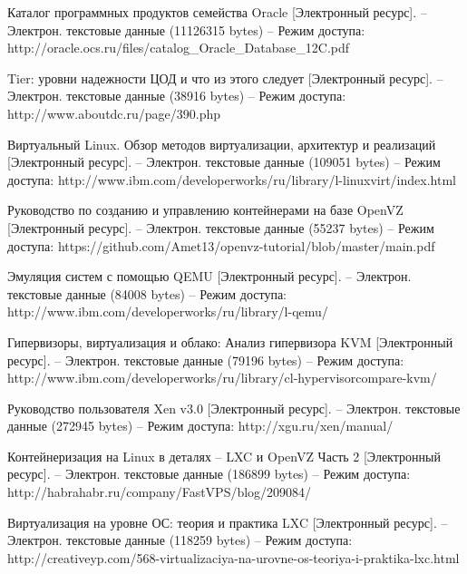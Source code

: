 \begingroup 
\renewcommand{\section}[2]{\anonsection{Библиографический список}}
\begin{thebibliography}{00}

    Каталог программных продуктов семейства Oracle
    [Электронный ресурс]. --
    Электрон. текстовые данные (11126315 bytes) --
    Режим доступа: http://oracle.ocs.ru/files/catalog\_Oracle\_Database\_12C.pdf

    Tier: уровни надежности ЦОД и что из этого следует
    [Электронный ресурс]. --
    Электрон. текстовые данные (38916 bytes) --
    Режим доступа: http://www.aboutdc.ru/page/390.php

    Виртуальный Linux. Обзор методов виртуализации, архитектур и реализаций
    [Электронный ресурс]. --
    Электрон. текстовые данные (109051 bytes) -- 
    Режим доступа: http://www.ibm.com/developerworks/ru/library/l-linuxvirt/index.html

    Руководство по созданию и управлению контейнерами на базе OpenVZ 
    [Электронный ресурс]. --
    Электрон. текстовые данные (55237 bytes) -- 
    Режим доступа: https://github.com/Amet13/openvz-tutorial/blob/master/main.pdf

    Эмуляция систем с помощью QEMU
    [Электронный ресурс]. --
    Электрон. текстовые данные (84008 bytes) --
    Режим доступа: http://www.ibm.com/developerworks/ru/library/l-qemu/

    Гипервизоры, виртуализация и облако: Анализ гипервизора KVM
    [Электронный ресурс]. --
    Электрон. текстовые данные (79196 bytes) --
    Режим доступа: http://www.ibm.com/developerworks/ru/library/cl-hypervisorcompare-kvm/

    Руководство пользователя Xen v3.0
    [Электронный ресурс]. --
    Электрон. текстовые данные (272945 bytes) --
    Режим доступа: http://xgu.ru/xen/manual/

    Контейнеризация на Linux в деталях -- LXC и OpenVZ Часть 2
    [Электронный ресурс]. --
    Электрон. текстовые данные (186899 bytes) -- 
    Режим доступа: http://habrahabr.ru/company/FastVPS/blog/209084/

    Виртуализация на уровне ОС: теория и практика LXC
    [Электронный ресурс]. --
    Электрон. текстовые данные (118259 bytes) --
    Режим доступа: http://creativeyp.com/568-virtualizaciya-na-urovne-os-teoriya-i-praktika-lxc.html


\end{thebibliography}
